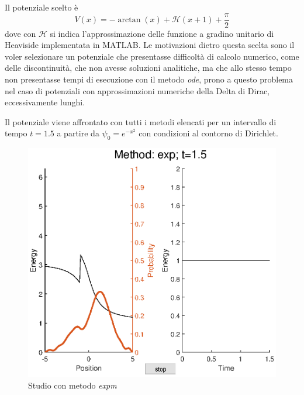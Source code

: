 \documentclass[a4paper,11pt,twoside,twocolumn]{article}
\begin{document}
Il potenziale scelto è 
\[
V(x)=-\arctan(x)+\mathcal{H}(x+1)+\frac{\pi}{2}
\]
dove con \(\mathcal{H}\) si indica l'approssimazione delle funzione a gradino unitario di Heaviside implementata in MATLAB. Le motivazioni dietro questa scelta sono il voler selezionare un potenziale che presentasse difficoltà di calcolo numerico, come delle discontinuità, che non avesse soluzioni analitiche, ma che allo stesso tempo non presentasse tempi di esecuzione con il metodo \textit{ode}, prono a questo problema nel caso di potenziali con approssimazioni numeriche della Delta di Dirac, eccessivamente lunghi.

Il potenziale viene affrontato con tutti i metodi elencati per un intervallo di tempo \(t=1.5\) a partire da \(\psi_0 = e^{-x^2}\) con condizioni al contorno di Dirichlet.

\begin{figure}
    \centering
    \includegraphics[width=1.0\columnwidth]{hexp}
    \caption{Studio con metodo \textit{expm}}
    \label{hexp}
\end{figure}
\end{document}
